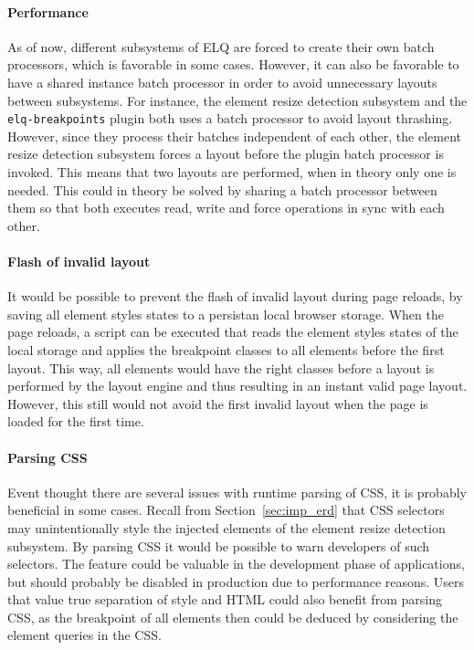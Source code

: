 \documentclass[a4paper,11pt]{kth-mag}
\newcommand{\code}[1]{\texttt{#1}}
\begin{document}
      \paragraph{Performance}
      As of now, different subsystems of \gls{ELQ} are forced to create their own batch processors, which is favorable in some cases.
      However, it can also be favorable to have a shared instance batch processor in order to avoid unnecessary layouts between subsystems.
      For instance, the element resize detection subsystem and the \code{elq-breakpoints} plugin both uses a batch processor to avoid layout thrashing.
      However, since they process their batches independent of each other, the element resize detection subsystem forces a layout before the plugin batch processor is invoked.
      This means that two layouts are performed, when in theory only one is needed.
      This could in theory be solved by sharing a batch processor between them so that both executes read, write and force operations in sync with each other.

      \paragraph{Flash of invalid layout}
      It would be possible to prevent the flash of invalid layout during page reloads, by saving all element styles states to a persistan local browser storage.
      When the page reloads, a script can be executed that reads the element styles states of the local storage and applies the breakpoint classes to all elements before the first layout.
      This way, all elements would have the right classes before a layout is performed by the layout engine and thus resulting in an instant valid page layout.
      However, this still would not avoid the first invalid layout when the page is loaded for the first time.

      \paragraph{Parsing CSS}
      Event thought there are several issues with runtime parsing of CSS, it is probably beneficial in some cases.
      Recall from Section~\ref{sec:imp_erd} that CSS selectors may unintentionally style the injected elements of the element resize detection subsystem.
      By parsing CSS it would be possible to warn developers of such selectors.
      The feature could be valuable in the development phase of applications, but should probably be disabled in production due to performance reasons.
      Users that value true separation of style and \gls{HTML} could also benefit from parsing CSS, as the breakpoint of all elements then could be deduced by considering the element queries in the CSS.
\end{document}
